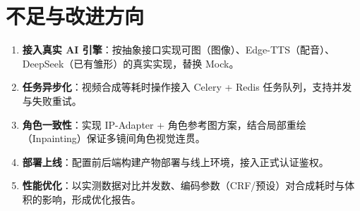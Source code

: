 \documentclass[12pt]{ctexrep}
\begin{document}
\section{不足与改进方向}

\begin{enumerate}
\item \textbf{接入真实 AI 引擎}：按抽象接口实现可图（图像）、Edge-TTS（配音）、DeepSeek（已有雏形）的真实实现，替换 Mock。
\item \textbf{任务异步化}：视频合成等耗时操作接入 Celery + Redis 任务队列，支持并发与失败重试。
\item \textbf{角色一致性}：实现 IP-Adapter + 角色参考图方案，结合局部重绘（Inpainting）保证多镜间角色视觉连贯。
\item \textbf{部署上线}：配置前后端构建产物部署与线上环境，接入正式认证鉴权。
\item \textbf{性能优化}：以实测数据对比并发数、编码参数（CRF/预设）对合成耗时与体积的影响，形成优化报告。
\end{enumerate}
\end{document}
